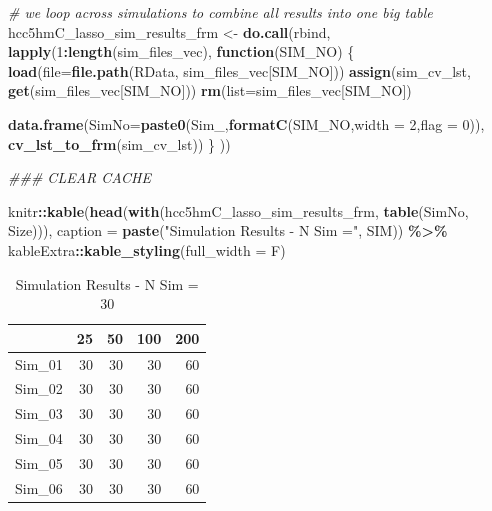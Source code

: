 \documentclass[
]{book}
\newenvironment{Shaded}{\begin{snugshade}}{\end{snugshade}}
\newcommand{\CommentTok}[1]{\textcolor[rgb]{0.56,0.35,0.01}{\textit{#1}}}
\newcommand{\ControlFlowTok}[1]{\textcolor[rgb]{0.13,0.29,0.53}{\textbf{#1}}}
\newcommand{\DataTypeTok}[1]{\textcolor[rgb]{0.13,0.29,0.53}{#1}}
\newcommand{\DecValTok}[1]{\textcolor[rgb]{0.00,0.00,0.81}{#1}}
\newcommand{\KeywordTok}[1]{\textcolor[rgb]{0.13,0.29,0.53}{\textbf{#1}}}
\newcommand{\NormalTok}[1]{#1}
\newcommand{\OperatorTok}[1]{\textcolor[rgb]{0.81,0.36,0.00}{\textbf{#1}}}
\newcommand{\StringTok}[1]{\textcolor[rgb]{0.31,0.60,0.02}{#1}}
\begin{document}
\begin{Shaded}
\begin{Highlighting}[]
\CommentTok{\# we loop across simulations to combine all results into one big table}
\NormalTok{hcc5hmC\_lasso\_sim\_results\_frm <{-}}\StringTok{ }\KeywordTok{do.call}\NormalTok{(}\StringTok{\textquotesingle{}rbind\textquotesingle{}}\NormalTok{, }\KeywordTok{lapply}\NormalTok{(}\DecValTok{1}\OperatorTok{:}\KeywordTok{length}\NormalTok{(sim\_files\_vec),}
 \ControlFlowTok{function}\NormalTok{(SIM\_NO) \{}
  \KeywordTok{load}\NormalTok{(}\DataTypeTok{file=}\KeywordTok{file.path}\NormalTok{(}\StringTok{\textquotesingle{}RData\textquotesingle{}}\NormalTok{, sim\_files\_vec[SIM\_NO]))}
  \KeywordTok{assign}\NormalTok{(}\StringTok{\textquotesingle{}sim\_cv\_lst\textquotesingle{}}\NormalTok{, }\KeywordTok{get}\NormalTok{(sim\_files\_vec[SIM\_NO]))}
  \KeywordTok{rm}\NormalTok{(}\DataTypeTok{list=}\NormalTok{sim\_files\_vec[SIM\_NO])}
  
  \KeywordTok{data.frame}\NormalTok{(}\DataTypeTok{SimNo=}\KeywordTok{paste0}\NormalTok{(}\StringTok{\textquotesingle{}Sim\_\textquotesingle{}}\NormalTok{,}\KeywordTok{formatC}\NormalTok{(SIM\_NO,}\DataTypeTok{width =} \DecValTok{2}\NormalTok{,}\DataTypeTok{flag =} \DecValTok{0}\NormalTok{)), }\KeywordTok{cv\_lst\_to\_frm}\NormalTok{(sim\_cv\_lst))}
\NormalTok{\} }
\NormalTok{)) }
\end{Highlighting}
\end{Shaded}

\begin{Shaded}
\begin{Highlighting}[]
\CommentTok{\#\#\# CLEAR CACHE}
 
\NormalTok{knitr}\OperatorTok{::}\KeywordTok{kable}\NormalTok{(}\KeywordTok{head}\NormalTok{(}\KeywordTok{with}\NormalTok{(hcc5hmC\_lasso\_sim\_results\_frm, }\KeywordTok{table}\NormalTok{(SimNo, Size))),}
  \DataTypeTok{caption =} \KeywordTok{paste}\NormalTok{(}\StringTok{"Simulation Results {-} N Sim ="}\NormalTok{, SIM)) }\OperatorTok{\%>\%}
\StringTok{   }\NormalTok{kableExtra}\OperatorTok{::}\KeywordTok{kable\_styling}\NormalTok{(}\DataTypeTok{full\_width =}\NormalTok{ F)}
\end{Highlighting}
\end{Shaded}

\begin{table}

\caption{\label{tab:hcc5hmC-glmnetSuite-sum-table}Simulation Results - N Sim = 30}
\centering
\begin{tabular}[t]{l|r|r|r|r}
\hline
  & 25 & 50 & 100 & 200\\
\hline
Sim\_01 & 30 & 30 & 30 & 60\\
\hline
Sim\_02 & 30 & 30 & 30 & 60\\
\hline
Sim\_03 & 30 & 30 & 30 & 60\\
\hline
Sim\_04 & 30 & 30 & 30 & 60\\
\hline
Sim\_05 & 30 & 30 & 30 & 60\\
\hline
Sim\_06 & 30 & 30 & 30 & 60\\
\hline
\end{tabular}
\end{table}
\end{document}
